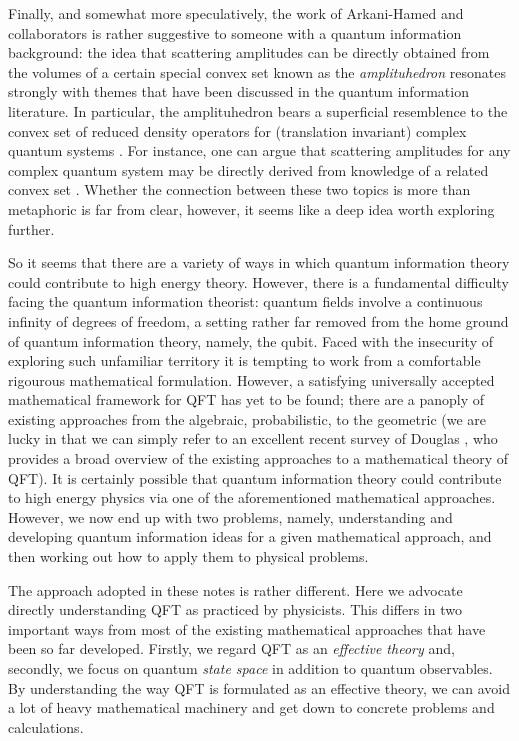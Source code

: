 \documentclass[11pt]{amsart}
\theoremstyle{plain}%
\theoremstyle{definition}
\theoremstyle{remark}
\begin{document}
Finally, and somewhat more speculatively, the work \cite{arkani-hamed_what_2010,arkani-hamed_into_2014,arkani-hamed_tree_2008,arkani-hamed_scattering_2012,arkani-hamed_all-loop_2011,arkani-hamed_amplituhedron_2014,arkani-hamed_s-matrix_2010,arkani-hamed_what_2010} of Arkani-Hamed and collaborators is rather suggestive to someone with a quantum information background: the idea that scattering amplitudes can be directly obtained from the volumes of a certain special convex set known as the \emph{amplituhedron} resonates strongly with themes that have been discussed in the quantum information literature. In particular, the amplituhedron bears a superficial resemblence to the convex set of reduced density operators for (translation invariant) complex quantum systems \cite{verstraete_matrix_2006,zauner_symmetry_2014}. For instance, one can argue that scattering amplitudes for any complex quantum system may be directly derived from knowledge of a related convex set \cite{osborne_tobiasosborne}. Whether the connection between these two topics is more than metaphoric is far from clear, however, it seems like a deep idea worth exploring further. 

So it seems that there are a variety of ways in which quantum information theory could contribute to high energy theory. However, there is a fundamental difficulty facing the quantum information theorist:  quantum fields involve a continuous infinity of degrees of freedom, a setting rather far removed from the home ground of quantum information theory, namely, the qubit. Faced with the insecurity of exploring such unfamiliar territory it is tempting to work from a comfortable rigourous mathematical formulation. However,  a satisfying universally accepted mathematical framework for QFT has yet to be found; there are a panoply of existing approaches from the algebraic, probabilistic, to the geometric (we are lucky in that we can simply refer to an excellent recent survey of Douglas \cite{douglas_foundations_2012}, who provides a broad overview of the existing approaches to a mathematical theory of QFT). It is certainly possible that quantum information theory could contribute to high energy physics via one of the aforementioned mathematical approaches. However, we now end up with two problems, namely, understanding and developing quantum information ideas for a given mathematical approach, and then working out how to apply them to physical problems. 

The approach adopted in these notes is rather different. Here we advocate directly understanding QFT as practiced by physicists. This differs in two important ways from most of the existing mathematical approaches that have been so far developed. Firstly, we regard QFT as an \emph{effective theory} and, secondly, we focus on quantum \emph{state space} in addition to quantum observables. By understanding the way QFT is formulated as an effective theory, we can avoid a lot of heavy mathematical machinery and get down to concrete problems and calculations. 
\end{document}
